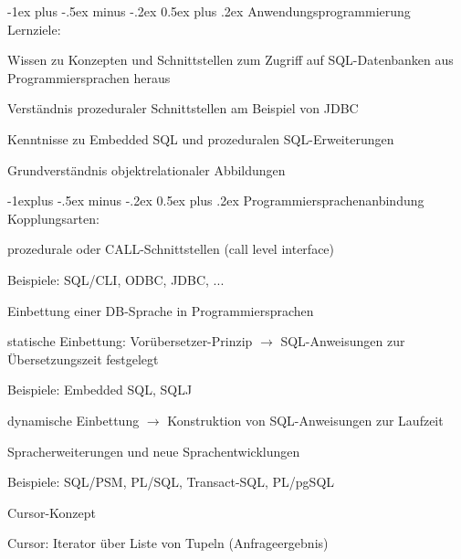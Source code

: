 \documentclass[a4paper]{article}
\makeatletter
\renewcommand{\section}{\@startsection{section}{1}{0mm}%
                                {-1ex plus -.5ex minus -.2ex}%
                                {0.5ex plus .2ex}%
                                {\normalfont\large\bfseries}}
\renewcommand{\subsection}{\@startsection{subsection}{2}{0mm}%
                                {-1explus -.5ex minus -.2ex}%
                                {0.5ex plus .2ex}%
                                {\normalfont\normalsize\bfseries}}
\makeatother
\begin{document}
\begin{multicols}{3}
\section{Anwendungsprogrammierung}
Lernziele:
\begin{itemize*}
    \item Wissen zu Konzepten und Schnittstellen zum Zugriff auf SQL-Datenbanken aus Programmiersprachen heraus
    \item Verständnis prozeduraler Schnittstellen am Beispiel von JDBC
    \item Kenntnisse zu Embedded SQL und prozeduralen SQL-Erweiterungen
    \item Grundverständnis objektrelationaler Abbildungen
\end{itemize*}

\subsection{Programmiersprachenanbindung}
Kopplungsarten:
\begin{itemize*}
    \item prozedurale oder CALL-Schnittstellen (call level interface)
    \begin{itemize*}
        \item Beispiele: SQL/CLI, ODBC, JDBC, ...
    \end{itemize*}
    \item Einbettung einer DB-Sprache in Programmiersprachen
    \begin{itemize*}
        \item statische Einbettung: Vorübersetzer-Prinzip $\rightarrow$ SQL-Anweisungen zur Übersetzungszeit festgelegt
        \item Beispiele: Embedded SQL, SQLJ
        \item dynamische Einbettung $\rightarrow$ Konstruktion von SQL-Anweisungen zur Laufzeit
    \end{itemize*}
    \item Spracherweiterungen und neue Sprachentwicklungen
    \begin{itemize*}
        \item Beispiele: SQL/PSM, PL/SQL, Transact-SQL, PL/pgSQL
    \end{itemize*}
    \item Cursor-Konzept
    \begin{itemize*}
        \item Cursor: Iterator über Liste von Tupeln (Anfrageergebnis)
    \end{itemize*}
\end{itemize*}


\end{multicols}
\end{document}

